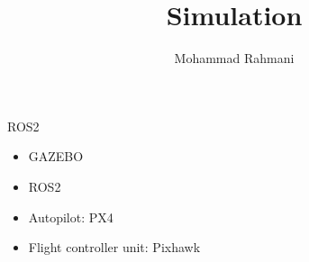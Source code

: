 \documentclass[a4paper]{article}
\title{Simulation}
\date{}
\author{Mohammad Rahmani}
\begin{document}
   \maketitle
   
   ROS2
   \begin{itemize}
       \item GAZEBO
       \item ROS2
       \item Autopilot: PX4
       \item Flight controller unit: Pixhawk
   \end{itemize}

   
   
\end{document}
